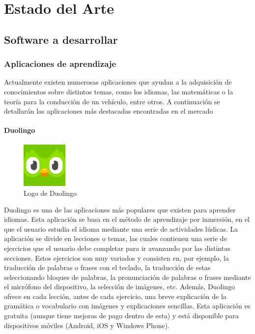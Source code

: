     \chapter{Estado del Arte}
    \section{Software a desarrollar}
    \subsection{Aplicaciones de aprendizaje}
    Actualmente existen numerosas aplicaciones que ayudan a la adquisición de conocimientos sobre distintos temas, 
    como los idiomas, las matemáticas o la teoría para la conducción de un vehículo, entre otros. A continuación se
    detallarán las aplicaciones más destacadas encontradas en el mercado
   
    \subsubsection{Duolingo}
    \begin{figure}
        \vspace*{-0.4cm}

        \centering
        \includegraphics[width=0.2\textwidth]{imagenes/c2/duolingo.png}
        \caption{Logo de Duolingo}
        \vspace*{-0.15cm}
    \end{figure}

    Duolingo es una de las aplicaciones más populares que existen para aprender idiomas. Esta aplicación se basa en el método
    de aprendizaje por inmersión, en el que el usuario estudia el idioma mediante una serie de actividades lúdicas.
    La aplicación se divide en lecciones o temas, las cuales contienen una serie de ejercicios que el usuario debe
    completar para ir avanzando por las distintas secciones. Estos ejercicios son muy variados y consisten en, por ejemplo,
    la traducción de palabras o frases con el teclado, la traducción de estas seleccionando bloques de palabras, la
    pronunciación de palabras o frases mediante el micrófono del dispositivo, la selección de imágenes, etc. Además,
    Duolingo ofrece en cada lección, antes de cada ejercicio, una breve explicación de la gramática o vocabulario con
    imágenes y explicaciones sencillas. Esta aplicación es gratuita (aunque tiene mejoras de pago dentro de esta) 
    y está disponible para dispositivos móviles (Android, iOS y Windows Phone).
 

